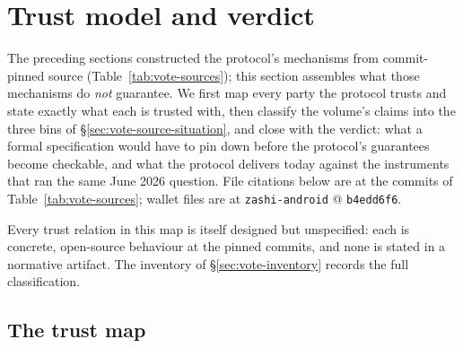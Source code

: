 \documentclass[11pt,a4paper]{article}
\theoremstyle{definition}
\begin{document}
\section{Trust model and verdict}\label{sec:vote-trust}

The preceding sections constructed the protocol's mechanisms from
commit-pinned source (Table~\ref{tab:vote-sources}); this section assembles
what those mechanisms do \emph{not} guarantee. We first map every party the
protocol trusts and state exactly what each is trusted with, then classify
the volume's claims into the three bins of
\S\ref{sec:vote-source-situation}, and close with the verdict: what a
formal specification would have to pin down before the protocol's
guarantees become checkable, and what the protocol delivers today against
the instruments that ran the same June 2026 question. File citations below
are at the commits of Table~\ref{tab:vote-sources}; wallet files are at
\texttt{zashi-android} @ \texttt{b4edd6f6}.

Every trust relation in this map is itself designed but unspecified: each
is concrete, open-source behaviour at the pinned commits, and none is
stated in a normative artifact. The inventory of
\S\ref{sec:vote-inventory} records the full classification.

\subsection{The trust map}\label{sec:vote-trust-map}
\end{document}
